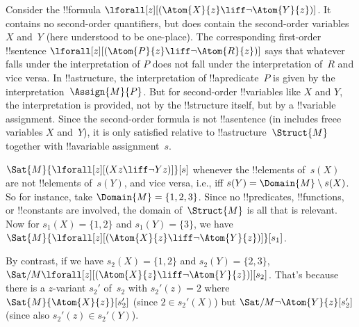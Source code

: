 \documentclass[../../../include/open-logic-section]{subfiles}
\begin{document}
\begin{ex}
  Consider the !!{formula} $\lforall[z][(\Atom{X}{z} \liff \lnot
    \Atom{Y}{z})]$. It contains no second-order quantifiers, but does
  contain the second-order variables $X$ and~$Y$ (here understood to
  be one-place). The corresponding first-order !!{sentence}
  $\lforall[z][(\Atom{P}{z} \liff \lnot \Atom{R}{z})]$ says that
  whatever falls under the interpretation of $P$ does not fall under
  the interpretation of~$R$ and vice versa. In !!a{structure}, the
  interpretation of !!a{predicate}~$P$ is given by the
  interpretation~$\Assign{M}{P}$. But for second-order !!{variable}s
  like $X$ and $Y$, the interpretation is provided, not by the
  !!{structure} itself, but by a !!{variable} assignment. Since the
  second-order formula is not !!a{sentence} (in includes freee
  variables $X$ and~$Y$), it is only satisfied relative to
  !!a{structure}~$\Struct{M}$ together with !!a{variable}
  assignment~$s$.

  $\Sat{M}{\lforall[z][(Xz \liff \lnot Yz)]}[s]$ whenever the
  !!{element}s of~$s(X)$ are not !!{element}s of~$s(Y)$, and vice
  versa, i.e., iff $s(Y) = \Domain{M} \setminus s(X)$. So for
  instance, take $\Domain{M} = \{1, 2, 3\}$. Since no !!{predicate}s,
  !!{function}s, or !!{constant}s are involved, the domain
  of~$\Struct{M}$ is all that is relevant. Now for $s_1(X) = \{1, 2\}$
  and $s_1(Y) = \{3\}$, we have $\Sat{M}{\lforall[z][(\Atom{X}{z}
      \liff \lnot \Atom{Y}{z})]}[s_1]$.

  By contrast, if we have $s_2(X) = \{1, 2\}$ and $s_2(Y) = \{2, 3\}$,
  $\Sat/{M}{\lforall[z][(\Atom{X}{z} \liff \lnot
      \Atom{Y}{z})]}[s_2]$. That's because there is a $z$-variant
  $s_2'$ of~$s_2$ with $s_2'(z) = 2$ where
  $\Sat{M}{\Atom{X}{z}}[s_2']$ (since $2 \in s_2'(X)$) but
  $\Sat/{M}{\lnot \Atom{Y}{z}}[s_2']$ (since also $s_2'(z) \in
  s_2'(Y)$).
\end{ex}
\end{document}

